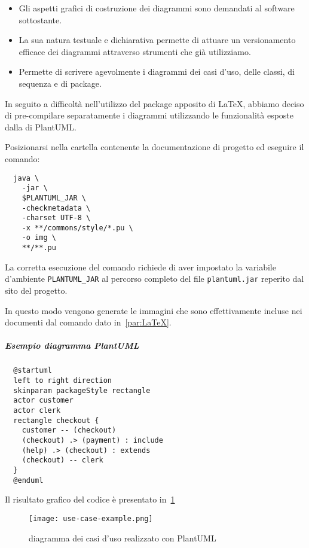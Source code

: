 \documentclass[../../norme-di-progetto.tex]{subfiles}
\begin{document}
\begin{itemize}
  \item Gli aspetti grafici di costruzione dei diagrammi sono demandati al software sottostante.
  \item La sua natura testuale e dichiarativa permette di attuare un versionamento efficace dei diagrammi attraverso strumenti che già utilizziamo.
  \item Permette di scrivere agevolmente i diagrammi dei casi d'uso, delle classi, di sequenza e di package.
\end{itemize}

In seguito a difficoltà nell'utilizzo del package apposito di \LaTeX{}, abbiamo deciso di pre-compilare separatamente i diagrammi utilizzando le funzionalità esposte dalla  di PlantUML\@.

Posizionarsi nella cartella contenente la documentazione di progetto ed eseguire il comando:

\begin{verbatim}
  java \
    -jar \
    $PLANTUML_JAR \
    -checkmetadata \
    -charset UTF-8 \
    -x **/commons/style/*.pu \
    -o img \
    **/**.pu
\end{verbatim}

La corretta esecuzione del comando richiede di aver impostato la variabile d'ambiente \verb|PLANTUML_JAR| al percorso completo del file \verb|plantuml.jar| reperito dal sito del progetto.

In questo modo vengono generate le immagini che sono effettivamente incluse nei documenti dal comando dato in~\ref{par:LaTeX}.

\subparagraph{Esempio diagramma PlantUML}%
\label{subp:esempio_diagramma_plantuml}

\begin{verbatim}
  @startuml
  left to right direction
  skinparam packageStyle rectangle
  actor customer
  actor clerk
  rectangle checkout {
    customer -- (checkout)
    (checkout) .> (payment) : include
    (help) .> (checkout) : extends
    (checkout) -- clerk
  }
  @enduml
\end{verbatim}

Il risultato grafico del codice è presentato in~\ref{fig:esempio_caso_duso}

\begin{figure}[H]%
  \label{fig:esempio_caso_duso}
  \texttt{[image: use-case-example.png]}
  \centering
  \caption{diagramma dei casi d'uso realizzato con PlantUML}
\end{figure}
\end{document}
